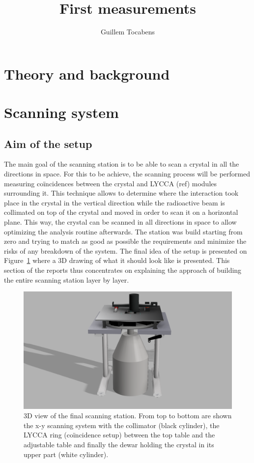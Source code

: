 \documentclass[11pt,a4paper]{article}
\author{Guillem Tocabens}
\title{First measurements}
\begin{document}
\section{Theory and background} \label{theory}

\section{Scanning system}

\subsection{Aim of the setup}

The main goal of the scanning station is to be able to scan a crystal in all the directions in space. For this to be achieve, the scanning process will be performed measuring coïncidences between the crystal and LYCCA (ref) modules surrounding it. This technique allows to determine where the interaction took place in the crystal in the vertical direction while the radioactive beam is collimated on top of the crystal and moved in order to scan it on a horizontal plane. This way, the crystal can be scanned in all directions in space to allow optimizing the analysis routine afterwards. The station was build starting from zero and trying to match as good as possible the requirements and minimize the risks of any breakdown of the system. The final idea of the setup is presented on Figure~\ref{3D_total} where a 3D drawing of what it should look like is presented. This section of the reports thus concentrates on explaining the approach of building the entire scanning station layer by layer.

\begin{figure}[!h]
\centering
\includegraphics[scale=0.2]{final_setup.png}
\caption{3D view of the final scanning station. From top to bottom are shown the x-y scanning system with the collimator (black cylinder), the LYCCA ring (coïncidence setup) between the top table and the adjustable table and finally the dewar holding the crystal in its upper part (white cylinder).}
\label{3D_total}
\end{figure}
\end{document}
